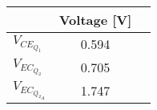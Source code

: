 \begin{tabular}[t]{lcc}
    \toprule
    &Voltage [V]\\
    \midrule
    $V_{CE_{Q_1}}$    &   0.594   \\
    $V_{EC_{Q_2}}$    &   0.705  \\
    $V_{EC_{Q_{2_A}}}$ &   1.747   \\
    \bottomrule
\end{tabular}

